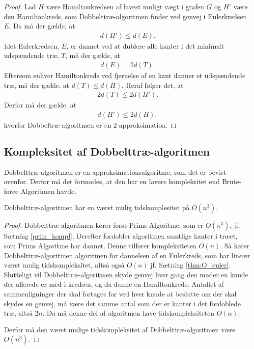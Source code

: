\begin{proof}
Lad $H$ være Hamiltonkredsen af lavest muligt vægt i grafen $G$ og $H'$ være den Hamiltonkreds, som Dobbelttræ-algoritmen finder ved genvej i Eulerkredsen $E$. Da må der gælde, at 
\begin{align*}
	d(H')\leq d(E).
\end{align*}
Idet Eulerkredsen, $E$, er dannet ved at dublere alle kanter i det minimalt udspændende træ, $T$, må der gælde, at 
\begin{align*}
	d(E) = 2d(T).
\end{align*}
Eftersom enhver Hamiltonkreds ved fjernelse af en kant danner et udspændende træ, må der gælde, at $d(T) \leq d(H)$.
	Heraf følger det, at
	\begin{align*}
		2d(T) \leq 2d(H').
	\end{align*}
Derfor må der gælde, at 
	\begin{align*}
		d(H') \leq 2d(H),
	\end{align*}
	hvorfor Dobbeltræ-algoritmen er en $2$-approksimation.
\end{proof}

\subsection{Kompleksitet af Dobbelttræ-algoritmen}
Dobbelttræ-algoritmen er en approksimationsalgoritme, som det er bevist ovenfor. Derfor må det formodes, at den har en lavere kompleksitet end Brute-force Algoritmen havde.

\begin{thm}
Dobbelttræ-algoritmen har en værst mulig tidskomplesitet på $O(n^3)$.
\end{thm}

\begin{proof}
Dobbelttræ-algoritmen kører først Prims Algoritme, som er $O(n^3)$, jf. Sætning \ref{prim_kompl}. 
Derefter fordobler algoritmen samtlige kanter i træet, som Prims Algoritme har dannet.
	Denne tilfører kompleksiteten $O(n)$.
	Så kører Dobbelttræ-algoritmen algoritmen for dannelsen af en Eulerkreds, som har lineær værst mulig tidskompleksitet, altså også $O(n)$ jf. Sætning \ref{thm:O_euler}.
Slutteligt vil Dobbelttræ-algoritmen skyde genvej hver gang den møder en knude der allerede er med i kredsen, og da danne en Hamiltonkreds. Antallet af sammenligninger der skal fortages for ved hver knude at beslutte om der skal skydes en genvej, må være det samme antal som der er kanter i det fordoblede træ, altså $2n$.
	Da må denne del af algoritmen have tidskompleksiteten $O(n)$.

	Derfor må den værst mulige tidskompleksitet af Dobbelttræ-algoritmen være $O(n^3)$.
\end{proof}

